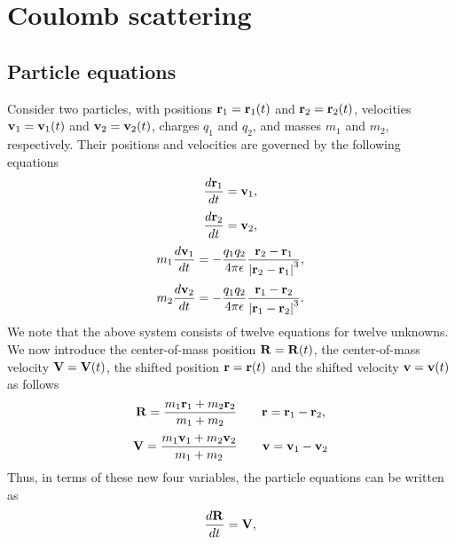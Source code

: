 \documentclass[a4paper,11pt]{report}
\begin{document}
\section{Coulomb scattering}
\subsection{Particle equations}
Consider two particles, with positions $\mathbf{r}_1=\mathbf{r}_1(t)$ and $\mathbf{r}_2=\mathbf{r}_2(t)$, velocities $\mathbf{v}_1=\mathbf{v}_1(t)$ and $\mathbf{v}_2=\mathbf{v}_2(t)$, charges $q_1$ and $q_2$, and masses $m_1$ and $m_2$, respectively. Their positions and velocities are governed by the following equations 
\begin{equation}
    \label{eq:particle_1_pos}
    \frac{d \mathbf{r}_1}{dt} = \mathbf{v}_1,
\end{equation}
\begin{equation}
    \label{eq:particle_2_pos}
    \frac{d \mathbf{r}_2}{dt} = \mathbf{v}_2,
\end{equation}
\begin{equation}
    \label{eq:particle_1_vel}
    m_1 \frac{d\mathbf{v}_1}{dt} = -\frac{q_1 q_2}{4 \pi \epsilon} \frac{\mathbf{r}_2 - \mathbf{r}_1}{\left | \mathbf{r}_2 - \mathbf{r}_1 \right |^3},
\end{equation}
\begin{equation}
    \label{eq:particle_2_vel}
    m_2 \frac{d\mathbf{v}_2}{dt} = -\frac{q_1 q_2}{4 \pi \epsilon} \frac{\mathbf{r}_1 - \mathbf{r}_2}{\left | \mathbf{r}_1 - \mathbf{r}_2 \right |^3}.
\end{equation}
We note that the above system consists of twelve equations for twelve unknowns. We now introduce the center-of-mass position $\mathbf{R} = \mathbf{R}(t)$, the center-of-mass velocity $\mathbf{V} = \mathbf{V}(t)$, the shifted position $\mathbf{r} = \mathbf{r}(t)$ and the shifted velocity $\mathbf{v} = \mathbf{v}(t)$ as follows
\begin{equation}
    \mathbf{R} = \frac{m_1 \mathbf{r}_1 + m_2 \mathbf{r}_2}{m_1 + m_2} \qquad \mathbf{r} = \mathbf{r}_1 - \mathbf{r}_2,
\end{equation}
\begin{equation}
    \mathbf{V} = \frac{m_1 \mathbf{v}_1 + m_2 \mathbf{v}_2}{m_1 + m_2} \qquad \mathbf{v} = \mathbf{v}_1 - \mathbf{v}_2
\end{equation}
Thus, in terms of these new four variables, the particle equations can be written as
\begin{equation}
    \frac{d \mathbf{R}}{dt} = \mathbf{V},
\end{equation}
\end{document}
